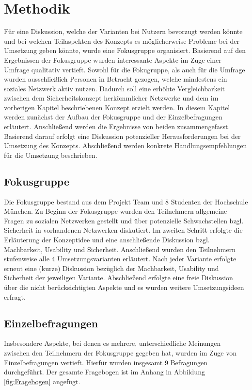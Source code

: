 \documentclass{sigchi}
\begin{document}
\section{Methodik}
Für eine Diskussion, welche der Varianten bei Nutzern bevorzugt werden könnte und bei welchen Teilaspekten des Konzepts es möglicherweise Probleme bei der Umsetzung geben könnte, wurde eine Fokusgruppe organisiert. Basierend auf den Ergebnissen der Fokusgruppe wurden interessante Aspekte im Zuge einer Umfrage qualitativ vertieft. Sowohl für die Fokugruppe, als auch für die Umfrage wurden ausschließlich Personen in Betracht gezogen, welche mindestens ein soziales Netzwerk aktiv nutzen. Dadurch soll eine erhöhte Vergleichbarkeit zwischen dem Sicherheitskonzept herkömmlicher Netzwerke und dem im vorherigen Kapitel beschriebenen Konzept erzielt werden. In diesem Kapitel werden zunächst der Aufbau der Fokusgruppe und der Einzelbefragungen erläutert. Anschließend werden die Ergebnisse von beiden zusammengefasst. Basierend darauf erfolgt eine Diskussion potenzieller Herausforderungen bei der Umsetzung des Konzepts. Abschließend werden konkrete Handlungsempfehlungen für die Umsetzung beschrieben.

\subsection{Fokusgruppe}
\label{Fokusgruppe}
Die Fokusgruppe bestand aus dem Projekt Team und 8 Studenten der Hochschule München. Zu Beginn der Fokusgruppe wurden den Teilnehmern allgemeine Fragen zu sozialen Netzwerken gestellt und über potenzielle Schwachstellen bzgl. Sicherheit in vorhandenen Netzwerken diskutiert. Im zweiten Schritt erfolgte die Erläuterung der Konzeptidee und eine anschließende Diskussion bzgl. Machbarkeit, Usability und Sicherheit. Anschließend wurden den Teilnehmern stufenweise alle 4 Umsetzungsvarianten erläutert. Nach jeder Variante erfolgte erneut eine (kurze) Diskussion bezüglich der Machbarkeit, Usability und Sicherheit der jeweiligen Variante. Abschließend erfolgte eine freie Diskussion über die nicht berücksichtigten Aspekte und es wurden weitere Umsetzungsideen erfragt.
 
\subsection{Einzelbefragungen}
\label{Einzelbefragung}
Insbesondere Aspekte, bei denen es mehrere, unterschiedliche Meinungen zwischen den Teilnehmern der Fokusgruppe gegeben hat, wurden im Zuge von Einzelbefragungen vertieft. Hierfür wurden insgesamt 9 Befragungen durchgeführt. Der gesamte Fragebogen ist im Anhang in Abbildung \ref{fig:Fragebogen} angefügt.
\end{document}
